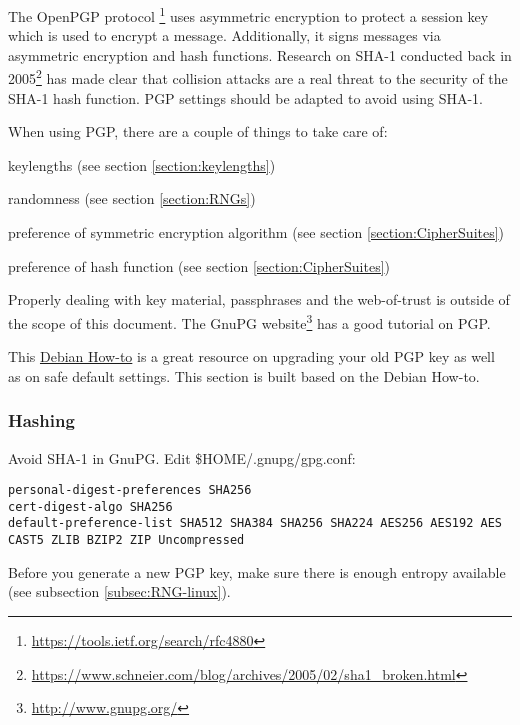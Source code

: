 The OpenPGP protocol
\footnote{\url{https://tools.ietf.org/search/rfc4880}}
 uses asymmetric encryption to protect a session key which is used to encrypt a message. Additionally, it signs messages via asymmetric encryption and hash functions. %
Research on SHA-1 conducted back in 2005\footnote{\url{https://www.schneier.com/blog/archives/2005/02/sha1\_broken.html}} has made clear that collision attacks are a real threat to the security of the SHA-1 hash function. PGP settings should be adapted to avoid using SHA-1.


When using PGP, there are a couple of things to take care of:
\begin{itemize*}
  \item keylengths (see section \ref{section:keylengths})
  \item randomness (see section \ref{section:RNGs})
  \item preference of symmetric encryption algorithm (see section \ref{section:CipherSuites})
  \item preference of hash function (see section \ref{section:CipherSuites})
\end{itemize*}

Properly dealing with key material, passphrases and the web-of-trust is outside of the scope of this document. The GnuPG website\footnote{\url{http://www.gnupg.org/}} has a good tutorial on PGP.

This \href{https://www.debian-administration.org/users/dkg/weblog/48}{Debian How-to} is a great resource on upgrading your old PGP key as well as on safe default settings. This section is built based on the Debian How-to.

\subsubsection{Hashing}
Avoid SHA-1 in GnuPG. Edit \$HOME/.gnupg/gpg.conf:

\begin{lstlisting}
personal-digest-preferences SHA256
cert-digest-algo SHA256
default-preference-list SHA512 SHA384 SHA256 SHA224 AES256 AES192 AES CAST5 ZLIB BZIP2 ZIP Uncompressed
\end{lstlisting}

Before you generate a new PGP key, make sure there is enough entropy available (see subsection \ref{subsec:RNG-linux}).



